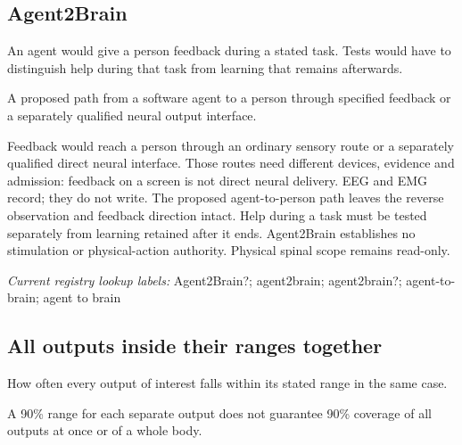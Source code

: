 \begin{samepage}
\subsection*{Agent2Brain}
\noindent An agent would give a person feedback during a stated task. Tests would have to distinguish help during that task from learning that remains afterwards.\par
\end{samepage}
\noindent A proposed path from a software agent to a person through specified feedback or a separately qualified neural output interface.\par
\begin{samepage}
\noindent Feedback would reach a person through an ordinary sensory route or a separately qualified direct neural interface. Those routes need different devices, evidence and admission: feedback on a screen is not direct neural delivery. EEG and EMG record; they do not write. The proposed agent-to-person path leaves the reverse observation and feedback direction intact. Help during a task must be tested separately from learning retained after it ends. Agent2Brain establishes no stimulation or physical-action authority. Physical spinal scope remains read-only.\par\nopagebreak[4]

\end{samepage}


\noindent\textit{Current registry lookup labels:} Agent2Brain?; agent2brain; agent2brain?; agent-to-brain; agent to brain\par

\begin{samepage}
\subsection*{All outputs inside their ranges together}
\noindent How often every output of interest falls within its stated range in the same case.\par
\end{samepage}
\begin{samepage}
\noindent A 90\% range for each separate output does not guarantee 90\% coverage of all outputs at once or of a whole body.\par\nopagebreak[4]

\end{samepage}


